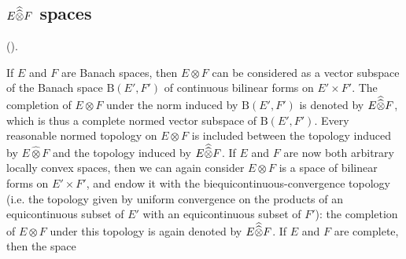 \documentclass{article}
\theoremstyle{plain}
\newcommand{\BB}{\mathrm{B}}
\newcommand{\hotimes}{\widehat{\otimes}}
\newcommand{\hhotimes}{\skew{0}{\widehat}{\skew{0}\widehat{\otimes}}}
\newcommand{\oldpage}[1]{\marginpar{\footnotesize$\Big\vert$ \textit{p.~#1}}}
\begin{document}
\subsection{\texorpdfstring{$E\hhotimes F$}{EF} spaces}
\label{subsection:E-hhotimes-F-spaces}

(\cite[chap.~1, \S3, n\textsuperscript{o}~3]{PTT}).
\medskip

If $E$ and $F$ are Banach spaces, then $E\otimes F$ can be considered as a vector subspace of the Banach space $\BB(E',F')$ of continuous bilinear forms
\oldpage{82}
on $E'\times F'$.
The completion of $E\otimes F$ under the norm induced by $\BB(E',F')$ is denoted by $E\hhotimes F$, which is thus a complete normed vector subspace of $\BB(E',F')$.
Every reasonable normed topology on $E\otimes F$ is included between the topology induced by $E\hotimes F$ and the topology induced by $E\hhotimes F$.
If $E$ and $F$ are now both arbitrary locally convex spaces, then we can again consider $E\otimes F$ is a space of bilinear forms on $E'\times F'$, and endow it with the biequicontinuous-convergence topology (i.e. the topology given by uniform convergence on the products of an equicontinuous subset of $E'$ with an equicontinuous subset of $F'$):
the completion of $E\otimes F$ under this topology is again denoted by $E\hhotimes F$.
If $E$ and $F$ are complete, then the space



\nocite{*}
\end{document}
